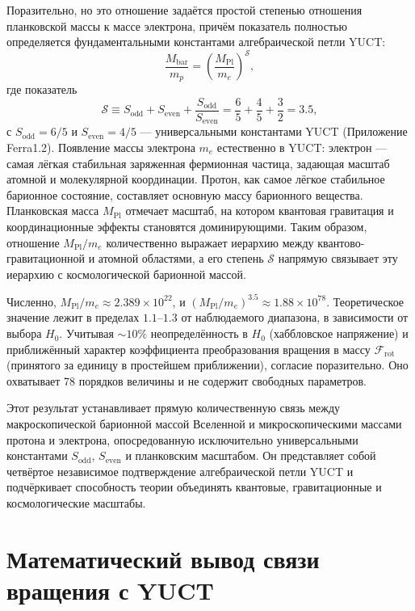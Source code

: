 \documentclass[11pt,a4paper]{article}
\newcommand{\Sodd}{S_{\mathrm{odd}}}
\newcommand{\Seven}{S_{\mathrm{even}}}
\begin{document}
	Поразительно, но это отношение задаётся простой степенью отношения планковской массы к массе электрона, причём показатель полностью определяется фундаментальными константами алгебраической петли YUCT:
	\begin{equation}
		\boxed{ \frac{M_{\mathrm{bar}}}{m_p} = \left( \frac{M_{\mathrm{Pl}}}{m_e} \right)^{\mathcal{S}} },
		\label{eq:baryon-hierarchy}
	\end{equation}
	где показатель
	\begin{equation}
		\mathcal{S} \equiv \Sodd + \Seven + \frac{\Sodd}{\Seven} = \frac{6}{5} + \frac{4}{5} + \frac{3}{2} = 3.5,
	\end{equation}
	с \(\Sodd = 6/5\) и \(\Seven = 4/5\) — универсальными константами YUCT (Приложение Ferra1.2). Появление массы электрона \(m_e\) естественно в YUCT: электрон — самая лёгкая стабильная заряженная фермионная частица, задающая масштаб атомной и молекулярной координации. Протон, как самое лёгкое стабильное барионное состояние, составляет основную массу барионного вещества. Планковская масса \(M_{\mathrm{Pl}}\) отмечает масштаб, на котором квантовая гравитация и координационные эффекты становятся доминирующими. Таким образом, отношение \(M_{\mathrm{Pl}}/m_e\) количественно выражает иерархию между квантово-гравитационной и атомной областями, а его степень \(\mathcal{S}\) напрямую связывает эту иерархию с космологической барионной массой.
	
	Численно, \(M_{\mathrm{Pl}}/m_e \approx 2.389 \times 10^{22}\), и \((M_{\mathrm{Pl}}/m_e)^{3.5} \approx 1.88 \times 10^{78}\). Теоретическое значение лежит в пределах \(1.1\)–\(1.3\) от наблюдаемого диапазона, в зависимости от выбора \(H_0\). Учитывая \(\sim 10\%\) неопределённость в \(H_0\) (хаббловское напряжение) и приближённый характер коэффициента преобразования вращения в массу \(\mathcal{F}_{\mathrm{rot}}\) (принятого за единицу в простейшем приближении), согласие поразительно. Оно охватывает 78 порядков величины и не содержит свободных параметров.
	
	Этот результат устанавливает прямую количественную связь между макроскопической барионной массой Вселенной и микроскопическими массами протона и электрона, опосредованную исключительно универсальными константами \(\Sodd\), \(\Seven\) и планковским масштабом. Он представляет собой четвёртое независимое подтверждение алгебраической петли YUCT и подчёркивает способность теории объединять квантовые, гравитационные и космологические масштабы.
	
	\section{Математический вывод связи вращения с YUCT}
	\label{sec:rotation-yuct}
	
\end{document}
